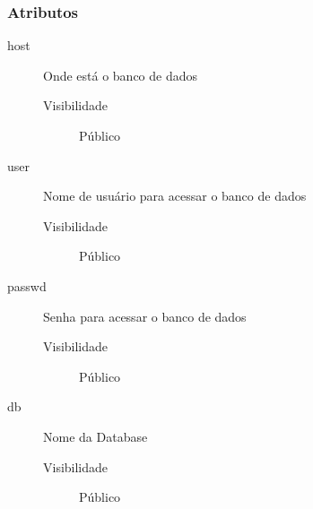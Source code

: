 \documentclass[a4paper]{article}
\begin{document}
	\subsubsection{Atributos}
		\begin{description}
		 \item [host] Onde está o banco de dados
			\begin{description}
			 \item [Visibilidade] Público
			\end{description}
		
		\item [user] Nome de usuário para acessar o banco de dados
			\begin{description}
			 \item [Visibilidade] Público
			\end{description}
			
		\item [passwd] Senha para acessar o banco de dados
			\begin{description}
			 \item [Visibilidade] Público
			\end{description}
			
		\item [db] Nome da Database
			\begin{description}
			 \item [Visibilidade] Público
			\end{description}

		\end{description}

	
\end{document}
